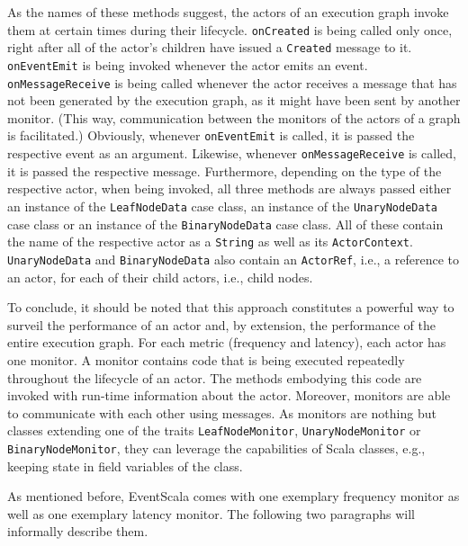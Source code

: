 \documentclass[article, 10pt, type=bsc, colorback, accentcolor=tud8b, parskip=half, bibliography=totocnumbered]{tudthesis}
\begin{document}
As the names of these methods suggest, the actors of an execution graph invoke them at certain times during their lifecycle.
\lstinline{onCreated} is being called only once, right after all of the actor's children have issued a \lstinline{Created} message to it.
\lstinline{onEventEmit} is being invoked whenever the actor emits an event.
\lstinline{onMessageReceive} is being called whenever the actor receives a message that has not been generated by the execution graph, as it might have been sent by another monitor.
(This way, communication between the monitors of the actors of a graph is facilitated.)
Obviously, whenever \lstinline{onEventEmit} is called, it is passed the respective event as an argument.
Likewise, whenever \lstinline{onMessageReceive} is called, it is passed the respective message.
Furthermore, depending on the type of the respective actor, when being invoked, all three methods are always passed either an instance of the \lstinline{LeafNodeData} case class, an instance of the \lstinline{UnaryNodeData} case class or an instance of the \lstinline{BinaryNodeData} case class.
All of these contain the name of the respective actor as a \lstinline{String} as well as its \lstinline{ActorContext}.
\lstinline{UnaryNodeData} and \lstinline{BinaryNodeData} also contain an \lstinline{ActorRef}, i.e., a reference to an actor, for each of their child actors, i.e., child nodes.

To conclude, it should be noted that this approach constitutes a powerful way to surveil the performance of an actor and, by extension, the performance of the entire execution graph.
For each metric (frequency and latency), each actor has one monitor.
A monitor contains code that is being executed repeatedly throughout the lifecycle of an actor.
The methods embodying this code are invoked with run-time information about the actor.
Moreover, monitors are able to communicate with each other using messages.
As monitors are nothing but classes extending one of the traits \lstinline{LeafNodeMonitor}, \lstinline{UnaryNodeMonitor} or \lstinline{BinaryNodeMonitor}, they can leverage the capabilities of Scala classes, e.g., keeping state in field variables of the class.

As mentioned before, EventScala comes with one exemplary frequency monitor as well as one exemplary latency monitor.
The following two paragraphs will informally describe them.
\end{document}
